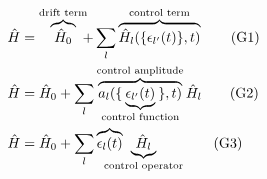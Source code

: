 \documentclass[preview,12pt]{standalone}
\newcommand{\Op}[1]{\ensuremath{\hat{#1}}}
\begin{document}
\begin{align}
  \Op{H} &= \overbrace{\Op{H}_0}^\text{drift term} \hspace{-5pt} + \sum_l \overbrace{\Op{H}_l(\{\epsilon_{l'}(t)\}, t)}^\text{control term}  \tag{G1} \\
  \Op{H} &= \Op{H}_0 + \sum_l \overbrace{a_{l}(
            \{ \hspace{-15pt}
              \underbrace{\epsilon_{l'}(t)}_\text{control function}
            \hspace{-15pt} \}, t
           )}^\text{control amplitude} \Op{H}_l \tag{G2} \\
  \Op{H} &= \Op{H}_0 + \sum_l \overbrace{\epsilon_l(t)}
            \hspace{-15pt} \underbrace{\Op{H}_l}_\text{control operator} \tag{G3}
\end{align}
\end{document}

